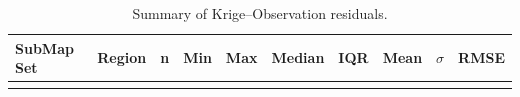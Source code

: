 \documentclass[final]{agujournal2019}
\begin{document}
\clearpage

\begin{longtable}[]{@{}
  >{\raggedright\arraybackslash}p{}
  >{\raggedleft\arraybackslash}p{}
  >{\raggedleft\arraybackslash}p{}
  >{\raggedleft\arraybackslash}p{}
  >{\raggedleft\arraybackslash}p{}
  >{\raggedleft\arraybackslash}p{}
  >{\raggedleft\arraybackslash}p{}
  >{\raggedleft\arraybackslash}p{}
  >{\raggedleft\arraybackslash}p{}
  >{\raggedleft\arraybackslash}p{}@{}}
\caption{Summary of Krige--Observation
residuals.}\label{tbl:krg-residual-summary}\tabularnewline
\toprule\noalign{}
\begin{minipage}[b]{\linewidth}\raggedright
SubMap Set
\end{minipage} & \begin{minipage}[b]{\linewidth}\raggedleft
Region
\end{minipage} & \begin{minipage}[b]{\linewidth}\raggedleft
n
\end{minipage} & \begin{minipage}[b]{\linewidth}\raggedleft
Min
\end{minipage} & \begin{minipage}[b]{\linewidth}\raggedleft
Max
\end{minipage} & \begin{minipage}[b]{\linewidth}\raggedleft
Median
\end{minipage} & \begin{minipage}[b]{\linewidth}\raggedleft
IQR
\end{minipage} & \begin{minipage}[b]{\linewidth}\raggedleft
Mean
\end{minipage} & \begin{minipage}[b]{\linewidth}\raggedleft
\(\sigma\)
\end{minipage} & \begin{minipage}[b]{\linewidth}\raggedleft
RMSE
\end{minipage} \\
\midrule\noalign{}
\endfirsthead
\toprule\noalign{}
\begin{minipage}[b]{\linewidth}\raggedright

\end{minipage}
\end{longtable}
\end{document}
